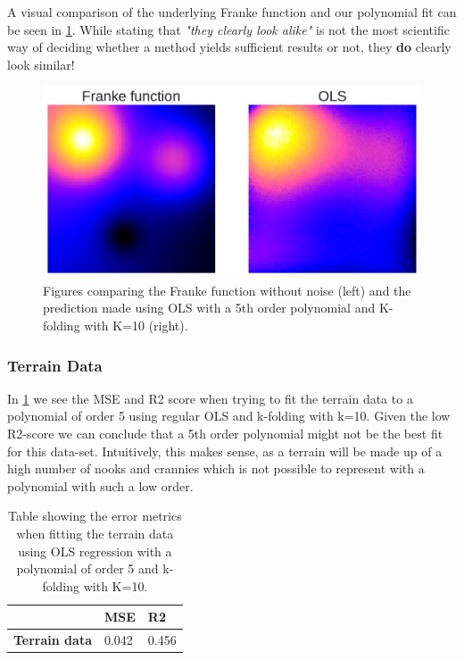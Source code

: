 \documentclass[10pt, twocolumn]{article}
\begin{document}
A visual comparison of the underlying Franke function and our polynomial fit can be seen in \cref{fig:franke_ols}. While stating that \textit{"they clearly look alike"} is not the most scientific way of deciding whether a method yields sufficient results or not, they \textbf{do} clearly look similar! 

\begin{figure}[h!]
    \centering
    \includegraphics[scale=0.4]{../figs/franke_vs_ols.pdf}
    \caption{Figures comparing the Franke function without noise (left) and the prediction made using OLS with a 5th order polynomial and K-folding with K=10 (right).}
    \label{fig:franke_ols}
\end{figure}

\subsubsection{Terrain Data}
In \cref{tab:error_metrics_terrain_data_ols} we see the MSE and R2 score when trying to fit the terrain data to a polynomial of order 5 using regular OLS and k-folding with k=10. Given the low R2-score we can conclude that a 5th order polynomial might not be the best fit for this data-set. Intuitively, this makes sense, as a terrain will be made up of a high number of nooks and crannies which is not possible to represent with a polynomial with such a low order.
\begin{table}[h!]
\centering
\begin{tabular}{l|l|l|}
\cline{2-3}
                                            & \textbf{MSE} & \textbf{R2} \\ \hline
\multicolumn{1}{|l|}{\textbf{Terrain data}} & 0.042        & 0.456       \\ \hline
\end{tabular}
\caption{Table showing the error metrics when fitting the terrain data using OLS regression with a polynomial of order 5 and k-folding with K=10.}
\label{tab:error_metrics_terrain_data_ols}
\end{table}
\end{document}
